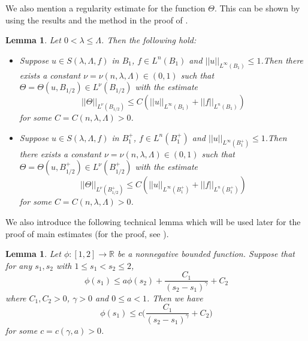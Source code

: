 \documentclass[11pt, reqno]{amsart}
\newtheorem{lemma}[theorem]{Lemma}
\numberwithin{equation}{section}
\begin{document}
We also mention a regularity estimate for the function $\Theta$.
This can be shown by using the results \cite[Lemma 2.9 - Proposition 2.12]{MR2486925} and the method in the proof of \cite[Proposition 7.4]{MR1351007}.

\begin{lemma} \label{w2del}
Let $0<\lambda \le \Lambda $.  %
Then the following hold:
\begin{itemize}
    \item[(a)] Suppose $ u \in S(\lambda, \Lambda,  f) $ in $B_{1} $, $f \in L^{n}(B_{1})$
and $||u||_{L^{\infty}(B_{1})}\le 1$.Then  there exists a constant $\nu=\nu(n,\lambda,\Lambda)\in(0,1)$ such that
$\Theta = \Theta(u,B_{1/2}) \in L^{\nu}(B_{1/2})$ with the estimate
$$||\Theta||_{L^{\nu}(B_{1/2})} \le C(||u||_{L^{\infty}(B_{1})}+||f||_{L^{n}(B_{1})}  )$$
for some $C=C(n,\lambda,\Lambda)>0$.
    \item[(b)] Suppose $ u \in S(\lambda, \Lambda,  f) $ in $B_{1}^{+}$, $f \in L^{n}(B_{1}^{+})$ %
and $||u||_{L^{\infty}(B_{1}^{+})}\le 1$.Then  there exists a constant $\nu=\nu(n,\lambda,\Lambda)\in(0,1)$ such that
$\Theta = \Theta(u,B_{1/2}^{+}) \in L^{\nu}(B_{1/2}^{+})$ with the estimate
$$||\Theta||_{L^{\nu}(B_{1/2}^{+})} \le C(||u||_{L^{\infty}(B_{1}^{+})}+||f||_{L^{n}(B_{1}^{+})}  )$$
for some $C=C(n,\lambda,\Lambda)>0$.
\end{itemize}
\end{lemma}


We also introduce the following technical lemma which will be used later for the proof of main estimates (for the proof, see \cite[Lemma 4.3]{MR2777537}).
\begin{lemma} \label{tchlm}
Let $\phi : [1,2] \to \mathbb{R}$ be a nonnegative bounded function.
Suppose that for any $s_{1},s_{2}$ with $1\le s_{1}<s_{2}\le 2$,
$$ \phi(s_{1}) \le a \phi(s_{2})+\frac{C_{1}}{(s_{2}-s_{1})^{\gamma}}+C_{2} $$
where $C_{1},C_{2}>0$, $\gamma>0$ and $0\le a <1$.
Then we have
$$ \phi(s_{1}) \le c\bigg(\frac{C_{1}}{(s_{2}-s_{1})^{\gamma}}+C_{2}\bigg)$$
for some $c=c(\gamma,a)>0$.
\end{lemma}
\end{document}
